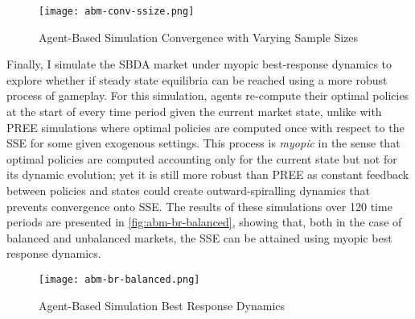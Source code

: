 \begin{figure}[ht] 
    \centering
    \caption{Agent-Based Simulation Convergence with Varying Sample Sizes}
    \texttt{[image: abm-conv-ssize.png]}
    \label{fig:abm-conv-ssize}
\end{figure} 

Finally, I simulate the SBDA market under myopic best-response dynamics to explore whether if steady state equilibria can be reached using a more robust process of gameplay. For this simulation, agents re-compute their optimal policies at the start of every time period given the current market state, unlike with PREE simulations where optimal policies are computed once with respect to the SSE for some given exogenous settings. This process is \textit{myopic} in the sense that optimal policies are computed accounting only for the current state but not for its dynamic evolution; yet it is still more robust than PREE as constant feedback between policies and states could create outward-spiralling dynamics that prevents convergence onto SSE. The results of these simulations over 120 time periods are presented in \autoref{fig:abm-br-balanced}, showing that, both in the case of balanced and unbalanced markets, the SSE can be attained using myopic best response dynamics.

\begin{figure}[ht] 
    \centering
    \caption{Agent-Based Simulation Best Response Dynamics}
    \texttt{[image: abm-br-balanced.png]}
    \label{fig:abm-br-balanced}
\end{figure}  



